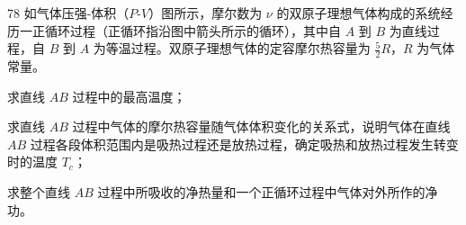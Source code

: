 \begin{problem}[第34届物理竞赛复赛][热力学循环]{78}
    如气体压强-体积（$P$-$V$）图所示，摩尔数为 $\nu$ 的双原子理想气体构成的系统经历一正循环过程（正循环指沿图中箭头所示的循环），其中自 $A$ 到 $B$ 为直线过程，自 $B$ 到 $A$ 为等温过程。双原子理想气体的定容摩尔热容量为 $\frac{5}{2}R$，$R$ 为气体常量。
    \begin{subproblem}
        求直线 $AB$ 过程中的最高温度；
    \end{subproblem}
    \begin{subproblem}
        求直线 $AB$ 过程中气体的摩尔热容量随气体体积变化的关系式，说明气体在直线 $AB$ 过程各段体积范围内是吸热过程还是放热过程，确定吸热和放热过程发生转变时的温度 $T_{c}$；
    \end{subproblem}
    \begin{subproblem}
        求整个直线 $AB$ 过程中所吸收的净热量和一个正循环过程中气体对外所作的净功。
    \end{subproblem}
\end{problem}
